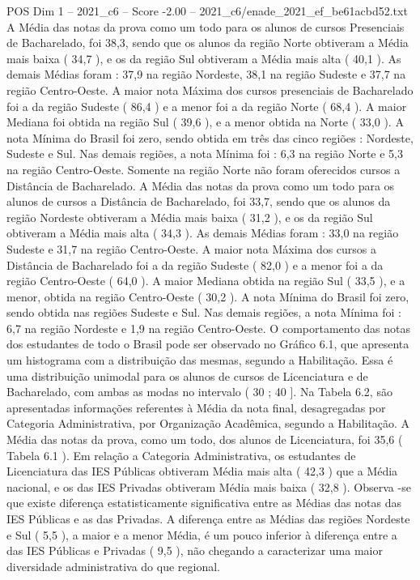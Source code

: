 \begin{textsample}{POS Dim 1 – 2021\_c6 – Score -2.00 – 2021\_c6/enade\_2021\_ef\_be61acbd52.txt}
A Média das notas da prova como um todo para os alunos de cursos Presenciais de Bacharelado, foi 38,3, sendo que os alunos da região Norte obtiveram a Média mais baixa ( 34,7 ), e os da região Sul obtiveram a Média mais alta ( 40,1 ).
As demais Médias foram : 37,9 na região Nordeste, 38,1 na região Sudeste e 37,7 na região Centro-Oeste.
A maior nota Máxima dos cursos presenciais de Bacharelado foi a da região Sudeste ( 86,4 ) e a menor foi a da região Norte ( 68,4 ).
A maior Mediana foi obtida na região Sul ( 39,6 ), e a menor obtida na Norte ( 33,0 ).
A nota Mínima do Brasil foi zero, sendo obtida em três das cinco regiões : Nordeste, Sudeste e Sul.
Nas demais regiões, a nota Mínima foi : 6,3 na região Norte e 5,3 na região Centro-Oeste.
Somente na região Norte não foram oferecidos cursos a Distância de Bacharelado.
A Média das notas da prova como um todo para os alunos de cursos a Distância de Bacharelado, foi 33,7, sendo que os alunos da região Nordeste obtiveram a Média mais baixa ( 31,2 ), e os da região Sul obtiveram a Média mais alta ( 34,3 ).
As demais Médias foram : 33,0 na região Sudeste e 31,7 na região Centro-Oeste.
A maior nota Máxima dos cursos a Distância de Bacharelado foi a da região Sudeste ( 82,0 ) e a menor foi a da região Centro-Oeste ( 64,0 ).
A maior Mediana obtida na região Sul ( 33,5 ), e a menor, obtida na região Centro-Oeste ( 30,2 ).
A nota Mínima do Brasil foi zero, sendo obtida nas regiões Sudeste e Sul.
Nas demais regiões, a nota Mínima foi : 6,7 na região Nordeste e 1,9 na região Centro-Oeste.
O comportamento das notas dos estudantes de todo o Brasil pode ser observado no Gráfico 6.1, que apresenta um histograma com a distribuição das mesmas, segundo a Habilitação.
Essa é uma distribuição unimodal para os alunos de cursos de Licenciatura e de Bacharelado, com ambas as modas no intervalo ( 30 ; 40 ].
Na Tabela 6.2, são apresentadas informações referentes à Média da nota final, desagregadas por Categoria Administrativa, por Organização Acadêmica, segundo a Habilitação.
A Média das notas da prova, como um todo, dos alunos de Licenciatura, foi 35,6 ( Tabela 6.1 ).
Em relação a Categoria Administrativa, os estudantes de Licenciatura das IES Públicas obtiveram Média mais alta ( 42,3 ) que a Média nacional, e os das IES Privadas obtiveram Média mais baixa ( 32,8 ).
Observa -se que existe diferença estatisticamente significativa entre as Médias das notas das IES Públicas e as das Privadas.
A diferença entre as Médias das regiões Nordeste e Sul ( 5,5 ), a maior e a menor Média, é um pouco inferior à diferença entre a das IES Públicas e Privadas ( 9,5 ), não chegando a caracterizar uma maior diversidade administrativa do que regional.

\end{textsample}

